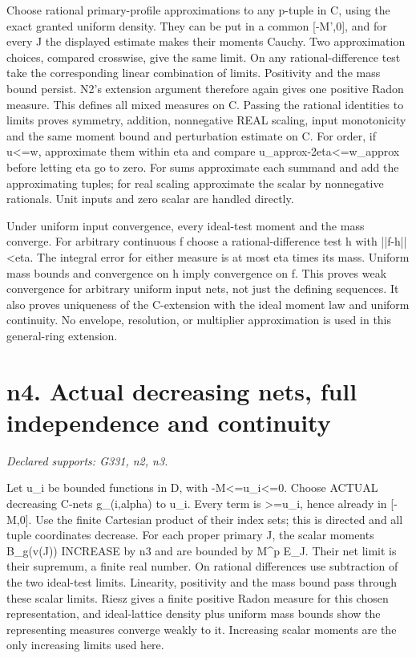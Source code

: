 \documentclass[11pt]{article}
\begin{document}
Choose rational primary-profile approximations to any p-tuple in C, using the exact granted uniform density. They can be put in a common [-M',0], and for every J the displayed estimate makes their moments Cauchy. Two approximation choices, compared crosswise, give the same limit. On any rational-difference test take the corresponding linear combination of limits. Positivity and the mass bound persist. N2's extension argument therefore again gives one positive Radon measure. This defines all mixed measures on C. Passing the rational identities to limits proves symmetry, addition, nonnegative REAL scaling, input monotonicity and the same moment bound and perturbation estimate on C. For order, if u<=w, approximate them within eta and compare u\_approx-2eta<=w\_approx before letting eta go to zero. For sums approximate each summand and add the approximating tuples; for real scaling approximate the scalar by nonnegative rationals. Unit inputs and zero scalar are handled directly.

Under uniform input convergence, every ideal-test moment and the mass converge. For arbitrary continuous f choose a rational-difference test h with ||f-h||<eta. The integral error for either measure is at most eta times its mass. Uniform mass bounds and convergence on h imply convergence on f. This proves weak convergence for arbitrary uniform input nets, not just the defining sequences. It also proves uniqueness of the C-extension with the ideal moment law and uniform continuity. No envelope, resolution, or multiplier approximation is used in this general-ring extension.

\section{n4. Actual decreasing nets, full independence and continuity}
\textit{Declared supports: G331, n2, n3.}

Let u\_i be bounded functions in D, with -M<=u\_i<=0. Choose ACTUAL decreasing C-nets g\_(i,alpha) to u\_i. Every term is >=u\_i, hence already in [-M,0]. Use the finite Cartesian product of their index sets; this is directed and all tuple coordinates decrease. For each proper primary J, the scalar moments B\_g(v(J)) INCREASE by n3 and are bounded by M\textasciicircum{}p E\_J. Their net limit is their supremum, a finite real number. On rational differences use subtraction of the two ideal-test limits. Linearity, positivity and the mass bound pass through these scalar limits. Riesz gives a finite positive Radon measure for this chosen representation, and ideal-lattice density plus uniform mass bounds show the representing measures converge weakly to it. Increasing scalar moments are the only increasing limits used here.
\end{document}
